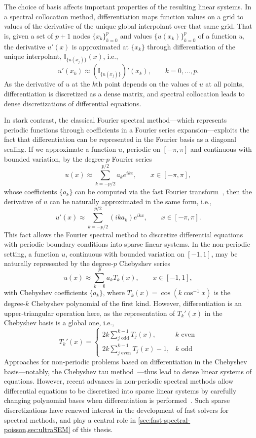 The choice of basis affects important properties of the resulting linear systems. In a spectral collocation method, differentiation maps function values on a grid to values of the derivative of the unique global interpolant over that same grid. That is, given a set of $p+1$ nodes $\{x_k\}_{k=0}^{p}$ and values $\{u(x_k)\}_{k=0}^{p}$ of a function $u$, the derivative $u'(x)$ is approximated at $\{x_k\}$ through differentiation of the unique interpolant, $\mathbb{I}_{\{u(x_j)\}}(x)$, i.e.,
\[
u'(x_k) \approx ( \mathbb{I}_{\{u(x_j)\}} )' (x_k), \qquad k = 0, \ldots, p.
\]
As the derivative of $u$ at the $k$th point depends on the values of $u$ at all points, differentiation is discretized as a dense matrix, and spectral collocation leads to dense discretizations of differential equations.

In stark contrast, the classical Fourier spectral method---which represents periodic functions through coefficients in a Fourier series expansion---exploits the fact that differentiation can be represented in the Fourier basis as a diagonal scaling. If we approximate a function $u$, periodic on $[-\pi,\pi]$ and continuous with bounded variation, by the degree-$p$ Fourier series
\[
u(x) \approx \sum_{k=-p/2}^{p/2} a_k e^{ikx}, \qquad x \in [-\pi,\pi],
\]
whose coefficients $\{a_k\}$ can be computed via the fast Fourier transform~\cite{Cooley_65_01}, then the derivative of $u$ can be naturally approximated in the same form, i.e.,
\[
u'(x) \approx \sum_{k=-p/2}^{p/2} (ik a_k) e^{ikx}, \qquad x \in [-\pi,\pi].
\]
This fact allows the Fourier spectral method to discretize differential equations with periodic boundary conditions into sparse linear systems. In the non-periodic setting, a function $u$, continuous with bounded variation on $[-1,1]$, may be naturally represented by the degree-$p$ Chebyshev series
\[
u(x) \approx \sum_{k=0}^{p} a_k T_k(x), \qquad x \in [-1,1],
\]
with Chebyshev coefficients $\{a_k\}$, where $T_k(x) = \cos(k \cos^{-1} x)$ is the degree-$k$ Chebyshev polynomial of the first kind. However, differentiation is an upper-triangular operation here, as the representation of $T_k'(x)$ in the Chebyshev basis is a global one, i.e.,
\[
T_k'(x) = \begin{cases}
2k \sum_{j \text{ odd}}^{k-1} T_j(x), & k \text{ even} \\
2k \sum_{j \text{ even}}^{k-1} T_j(x)-1, & k \text{ odd}
\end{cases}
\]
Approaches for non-periodic problems based on differentiation in the Chebyshev basis---notably, the Chebyshev tau method~\cite{Lanczos_38_01,Ortiz_69_01,Orszag_71_01,Orszag_77_01,Ortiz_81_01}---thus lead to dense linear systems of equations. However, recent advances in non-periodic spectral methods allow differential equations to be discretized into sparse linear systems by carefully changing polynomial bases when differentiation is performed~\cite{Olver_13_01,Olver_13_01_inf,Townsend_15_01,Olver_19_01}. Such sparse discretizations have renewed interest in the development of fast solvers for spectral methods, and play a central role in \cref{sec:fast-spectral-poisson,sec:ultraSEM} of this thesis.

